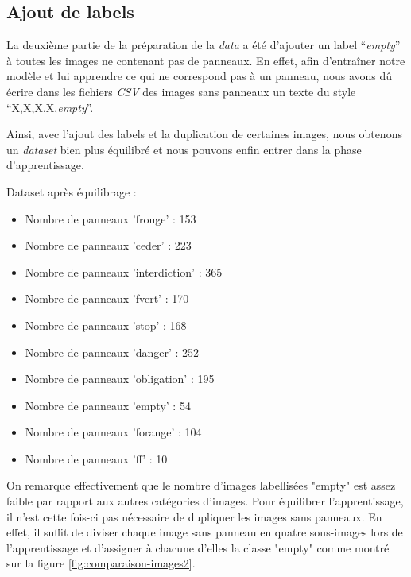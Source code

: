 \documentclass[twocolumn,10pt]{article}
\begin{document}
    \subsection{Ajout de labels}
    La deuxième partie de la préparation de la \textit{data} a été d’ajouter un label “\textit{empty}” à toutes les images ne contenant pas de panneaux. En effet, afin d’entraîner notre modèle et lui apprendre ce qui ne correspond pas à un panneau, nous avons dû écrire dans les fichiers \textit{CSV} des images sans panneaux un texte du style “X,X,X,X,\textit{empty}”.

    Ainsi, avec l’ajout des labels et la duplication de certaines images, nous obtenons un \textit{dataset} bien plus équilibré et nous pouvons enfin entrer dans la phase d’apprentissage.


    Dataset après équilibrage :
    \begin{itemize}
        \item Nombre de panneaux 'frouge' : 153
        \item Nombre de panneaux 'ceder' : 223
        \item Nombre de panneaux 'interdiction' : 365
        \item Nombre de panneaux 'fvert' : 170
        \item Nombre de panneaux 'stop' : 168
        \item Nombre de panneaux 'danger' : 252
        \item Nombre de panneaux 'obligation' : 195
        \item Nombre de panneaux 'empty' : 54
        \item Nombre de panneaux 'forange' : 104
        \item Nombre de panneaux 'ff' : 10
    \end{itemize}
    \vspace{\baselineskip} %

    On remarque effectivement que le nombre d'images labellisées "empty" est assez faible par rapport aux autres catégories d'images.
    Pour équilibrer l'apprentissage, il n'est cette fois-ci pas nécessaire de dupliquer les images sans panneaux.
    En effet, il suffit de diviser chaque image sans panneau en quatre sous-images lors de l'apprentissage et d'assigner à chacune d'elles la classe "empty" comme montré sur la figure \ref{fig:comparaison-images2}.
\end{document}
